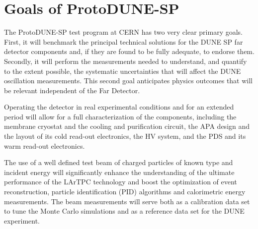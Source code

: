 \section{Goals of ProtoDUNE-SP}

The ProtoDUNE-SP test program at CERN has two very clear primary goals. First, it will benchmark the principal technical solutions for the DUNE SP far detector components and, if they are found to be fully adequate, to endorse them. Secondly, it will perform the measurements needed to understand, and quantify to the extent possible, the systematic uncertainties that will affect the DUNE oscillation measurements. This second goal anticipates physics outcomes that will be relevant independent of the Far Detector.

Operating the detector in real experimental conditions and for an extended period will allow for a full characterization of the components, including the membrane cryostat and the cooling and purification circuit, the APA design and the layout of its cold read-out electronics, the HV system, and the PDS and its warm read-out electronics.

The use of a well defined test beam of charged particles of known type and incident  energy will significantly enhance the understanding of the ultimate performance of the LArTPC technology and boost the optimization of event reconstruction, particle identification (PID) algorithms and calorimetric energy measurements.  The beam measurements will serve both as a calibration data set to tune the Monte Carlo simulations and as a reference data set for the DUNE experiment. 

